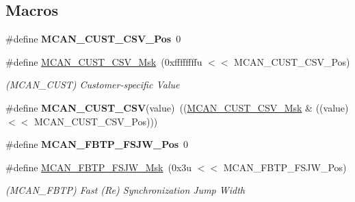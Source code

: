 \subsection*{Macros}
\begin{DoxyCompactItemize}
\item 
\mbox{\label{group__SAME70__MCAN_gaf4c8e16054ae8c19081e637a94dc80d3}} 
\#define {\bfseries M\+C\+A\+N\+\_\+\+C\+U\+S\+T\+\_\+\+C\+S\+V\+\_\+\+Pos}~0
\item 
\mbox{\label{group__SAME70__MCAN_ga06ab3cbe5adf56e5e3012b14f3226b8f}} 
\#define \mbox{\hyperlink{group__SAME70__MCAN_ga06ab3cbe5adf56e5e3012b14f3226b8f}{M\+C\+A\+N\+\_\+\+C\+U\+S\+T\+\_\+\+C\+S\+V\+\_\+\+Msk}}~(0xffffffffu $<$$<$ M\+C\+A\+N\+\_\+\+C\+U\+S\+T\+\_\+\+C\+S\+V\+\_\+\+Pos)
\begin{DoxyCompactList}\small\item\em (M\+C\+A\+N\+\_\+\+C\+U\+ST) Customer-\/specific Value \end{DoxyCompactList}\item 
\mbox{\label{group__SAME70__MCAN_ga0949acddf43859f0dc102aa87590c3c8}} 
\#define {\bfseries M\+C\+A\+N\+\_\+\+C\+U\+S\+T\+\_\+\+C\+SV}(value)~((\mbox{\hyperlink{group__SAMV71__MCAN_ga06ab3cbe5adf56e5e3012b14f3226b8f}{M\+C\+A\+N\+\_\+\+C\+U\+S\+T\+\_\+\+C\+S\+V\+\_\+\+Msk}} \& ((value) $<$$<$ M\+C\+A\+N\+\_\+\+C\+U\+S\+T\+\_\+\+C\+S\+V\+\_\+\+Pos)))
\item 
\mbox{\label{group__SAME70__MCAN_ga4e9c7aa75adc93d769bda7e441d1f7c3}} 
\#define {\bfseries M\+C\+A\+N\+\_\+\+F\+B\+T\+P\+\_\+\+F\+S\+J\+W\+\_\+\+Pos}~0
\item 
\mbox{\label{group__SAME70__MCAN_ga4aa47bcd4810bbec418c86ad7616babc}} 
\#define \mbox{\hyperlink{group__SAME70__MCAN_ga4aa47bcd4810bbec418c86ad7616babc}{M\+C\+A\+N\+\_\+\+F\+B\+T\+P\+\_\+\+F\+S\+J\+W\+\_\+\+Msk}}~(0x3u $<$$<$ M\+C\+A\+N\+\_\+\+F\+B\+T\+P\+\_\+\+F\+S\+J\+W\+\_\+\+Pos)
\begin{DoxyCompactList}\small\item\em (M\+C\+A\+N\+\_\+\+F\+B\+TP) Fast (Re) Synchronization Jump Width \end{DoxyCompactList}\item 
\mbox{\label{group__SAME70__MCAN_ga9492dc42a1039ce9374fe00748471c39}} 
$$
\end{DoxyCompactItemize}
